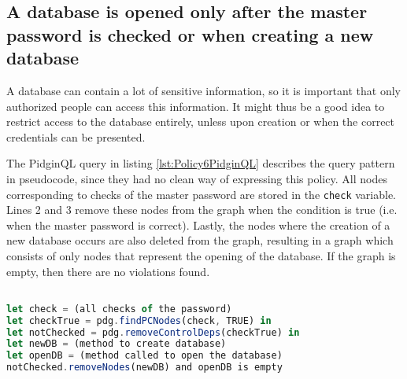 

\subsection{A database is opened only after the master password
is checked or when creating a new database}

A database can contain a lot of sensitive information, so it is important that only authorized people can access this information. It might thus be a good idea to restrict access to the database entirely, unless upon creation or when the correct credentials can be presented. 

The PidginQL query in listing \ref{lst:Policy6PidginQL} describes the query pattern in pseudocode, since they had no clean way of expressing this policy. All nodes corresponding to checks of the master password are stored in the \texttt{check} variable. Lines 2 and 3 remove these nodes from the graph when the condition is true (i.e. when the master password is correct). Lastly, the nodes where the creation of a new database occurs are also deleted from the graph, resulting in a graph which consists of only nodes that represent the opening of the database. If the graph is empty, then there are no violations found.

\begin{lstlisting}[label={lst:Policy6PidginQL},language=JavaScript,caption=Policy 6 in PidginQL,mathescape=true]  % float=t?

let check = (all checks of the password)
let checkTrue = pdg.findPCNodes(check, TRUE) in
let notChecked = pdg.removeControlDeps(checkTrue) in
let newDB = (method to create database)
let openDB = (method called to open the database)
notChecked.removeNodes(newDB) and openDB is empty
\end{lstlisting}


